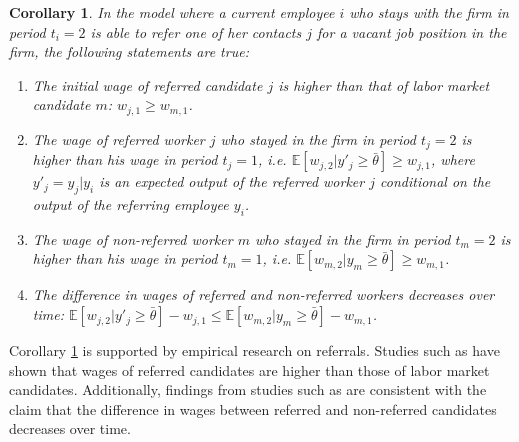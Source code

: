 \documentclass[12pt]{article}
\newtheorem{corollary}[theorem]{Corollary}
\begin{document}
\begin{corollary}\label{cor:wages_vr}
    In the model where a current employee $i$ who stays with the firm in period $t_i = 2$ is able to refer one of her contacts $j$ for a vacant job position in the firm, the following statements are true:
    \begin{enumerate}[label={\roman*})]
        \item The initial wage of referred candidate $j$ is higher than that of labor market candidate $m$:
        $w_{j,1} \geq w_{m,1}$.
        \item The wage of referred worker $j$ who stayed in the firm in period $t_j = 2$ is higher than his wage in period $t_j = 1$, i.e. $\mathbb{E}[w_{j,2}|y'_j \geq \bar{\theta}] \geq w_{j,1}$, where $y'_j = y_j | y_i$ is an expected output of the referred worker $j$ conditional on the output of the referring employee $y_i$.
        \item The wage of non-referred worker $m$ who stayed in the firm in period $t_m = 2$ is higher than his wage in period $t_m = 1$, i.e. $\mathbb{E}[w_{m,2}|y_m \geq \bar{\theta}] \geq w_{m,1}$.
        \item The difference in wages of referred and non-referred workers decreases over time: $\mathbb{E}[w_{j,2}|y'_j \geq \bar{\theta}] - w_{j,1} \leq \mathbb{E}[w_{m,2}|y_m \geq \bar{\theta}]- w_{m,1}$.
    \end{enumerate}
\end{corollary}

Corollary \ref{cor:wages_vr} is supported by empirical research on referrals. Studies such as \cite{corcoran1980most, korenman1996employment, loury2006some} have shown that wages of referred candidates are higher than those of labor market candidates. Additionally, findings from studies such as \cite{montgomery1991social, simon1992matchmaker, dustmann2016referral} are consistent with the claim that the difference in wages between referred and non-referred candidates decreases over time.
\end{document}
